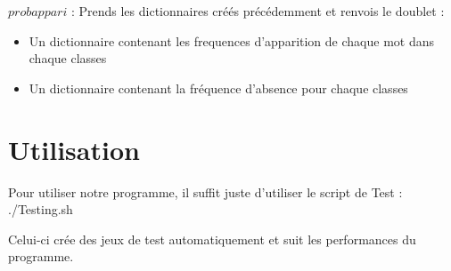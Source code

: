 \documentclass[a4paper,11pt]{article}
\begin{document}
	
	$probappari$ : Prends les dictionnaires créés précédemment et renvois le doublet :
	\begin{itemize}
	\item Un dictionnaire contenant les frequences d'apparition de chaque mot dans chaque classes 
	\item Un dictionnaire contenant la fréquence d'absence pour chaque classes
	\end {itemize}
\section{Utilisation}

Pour utiliser notre programme, il suffit juste d'utiliser le script de Test : ./Testing.sh 

Celui-ci crée des jeux de test automatiquement et suit les performances du programme.
\end{document}
